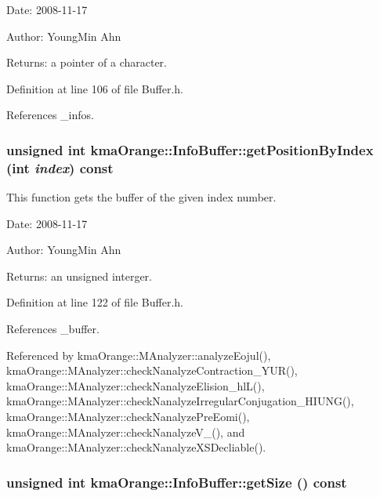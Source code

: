 \begin{Desc}
\item[Date:]2008-11-17 \end{Desc}
\begin{Desc}
\item[Author:]YoungMin Ahn \end{Desc}
\begin{Desc}
\item[Returns:]a pointer of a character. \end{Desc}


Definition at line 106 of file Buffer.h.

References \_\-infos.\hypertarget{classkmaOrange_1_1InfoBuffer_75d7cc13e2eac9f1c1fa3322291663cb}{
\subsubsection[{getPositionByIndex}]{\setlength{\rightskip}{0pt plus 5cm}unsigned int kmaOrange::InfoBuffer::getPositionByIndex (int {\em index}) const}}
\label{classkmaOrange_1_1InfoBuffer_75d7cc13e2eac9f1c1fa3322291663cb}


This function gets the buffer of the given index number. 

\begin{Desc}
\item[Date:]2008-11-17 \end{Desc}
\begin{Desc}
\item[Author:]YoungMin Ahn \end{Desc}
\begin{Desc}
\item[Returns:]an unsigned interger. \end{Desc}


Definition at line 122 of file Buffer.h.

References \_\-buffer.

Referenced by kmaOrange::MAnalyzer::analyzeEojul(), kmaOrange::MAnalyzer::checkNanalyzeContraction\_\-YUR(), kmaOrange::MAnalyzer::checkNanalyzeElision\_\-hlL(), kmaOrange::MAnalyzer::checkNanalyzeIrregularConjugation\_\-HIUNG(), kmaOrange::MAnalyzer::checkNanalyzePreEomi(), kmaOrange::MAnalyzer::checkNanalyzeV\_\-(), and kmaOrange::MAnalyzer::checkNanalyzeXSDecliable().\hypertarget{classkmaOrange_1_1InfoBuffer_e94373995e74a292b9d243258eb1aab2}{
\subsubsection[{getSize}]{\setlength{\rightskip}{0pt plus 5cm}unsigned int kmaOrange::InfoBuffer::getSize () const}}
\label{classkmaOrange_1_1InfoBuffer_e94373995e74a292b9d243258eb1aab2}


